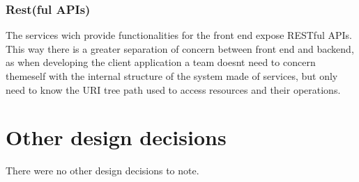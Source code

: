 \subsubsection{Rest(ful APIs)}

The services wich provide functionalities for the front end expose RESTful APIs.  
This way there is a greater separation of concern between front end and backend, as when developing the client application a team doesnt need to concern themeself with the internal structure of the system made of services, but only need to know the URI tree path used to access resources and their operations.

\section{Other design decisions}

There were no other design decisions to note.